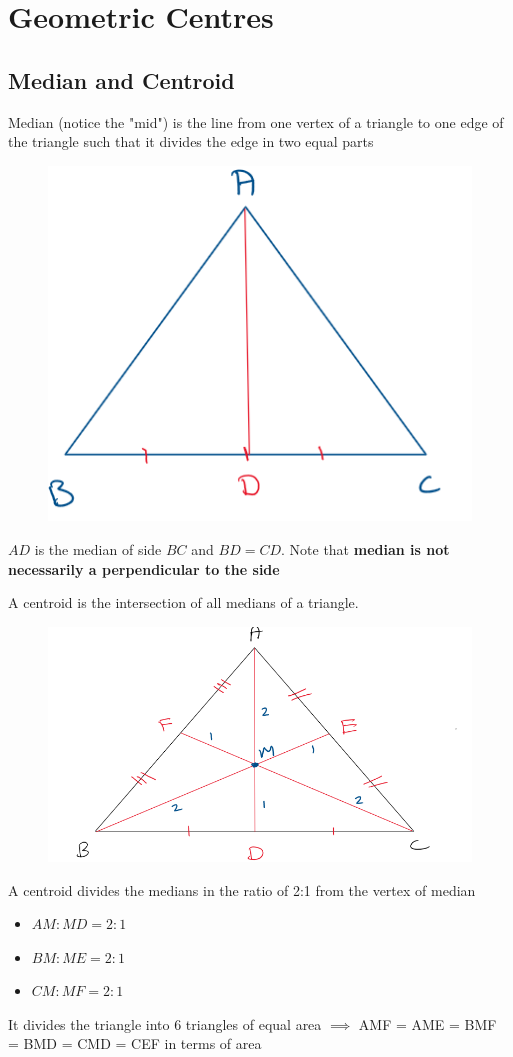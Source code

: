 \section{Geometric Centres}

\subsection{Median and Centroid}

Median (notice the "mid") is the line from one vertex of a triangle to one edge of the triangle such that it divides the edge in two equal parts \\

\begin{figure}[h!]
    \centering
    \includegraphics[width=0.25\linewidth]{Quant//Geometry//Images//Triangles/triangle_median_intro.png}
\end{figure}


$AD$ is the median of side $BC$ and $BD = CD$. Note that \textbf{median is not necessarily a perpendicular to the side} 

A centroid is the intersection of all medians of a triangle. 

\begin{figure}[h!]
    \centering
    \includegraphics[width=0.4\linewidth]{Quant//Geometry//Images//Triangles/triangle_centroid_intro.png}    
\end{figure}
        

A centroid divides the medians in the ratio of 2:1 from the vertex of median
\begin{itemize}
    \item $AM : MD = 2 : 1$
    \item $BM : ME = 2 : 1$
    \item $CM : MF = 2 : 1$
\end{itemize}
It divides the triangle into 6 triangles of equal area $\implies$ AMF = AME = BMF = BMD = CMD = CEF in terms of area

